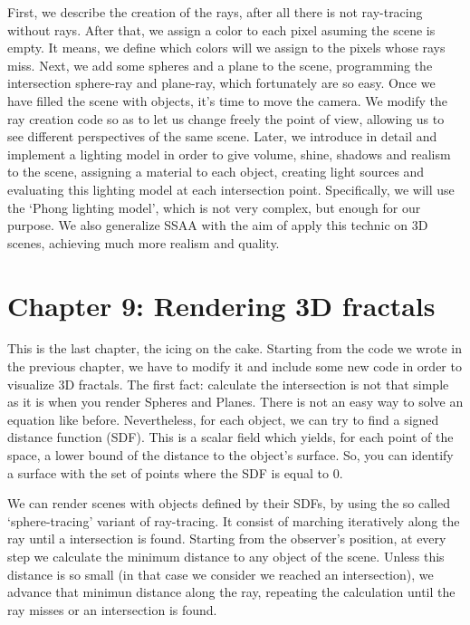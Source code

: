 First, we describe the creation of the rays, after all there is not ray-tracing without rays. After that, we assign a color to each pixel asuming the scene is empty. It means, we define which colors will we assign to the pixels whose rays miss. Next, we add some spheres and a plane to the scene, programming the intersection sphere-ray and plane-ray, which fortunately are so easy. Once we have filled the scene with objects, it's time to move the camera. We modify the ray creation code so as to let us change freely the point of view, allowing us to see different perspectives of the same scene. Later, we introduce in detail and implement a lighting model in order to give volume, shine, shadows and realism to the scene, assigning a material to each object, creating light sources and evaluating this lighting model at each intersection point. Specifically, we will use the `Phong lighting model', which is not very complex, but enough for our purpose. We also generalize SSAA with the aim of apply this technic on 3D scenes, achieving much more realism and quality.

\section*{Chapter 9: Rendering 3D fractals}

This is the last chapter, the icing on the cake. Starting from the code we wrote in the previous chapter, we have to modify it and include some new code in order to visualize 3D fractals. The first fact: calculate the intersection is not that simple as it is when you render Spheres and Planes. There is not an easy way to solve an equation like before. Nevertheless, for each object, we can try to find a signed distance function (SDF). This is a scalar field which yields, for each point of the space, a lower bound of the distance to the object's surface. So, you can identify a surface with the set of points where the SDF is equal to 0.

We can render scenes with objects defined by their SDFs, by using the so called `sphere-tracing' variant of ray-tracing. It consist of marching iteratively along the ray until a intersection is found. Starting from the observer's position, at every step we calculate the minimum distance to any object of the scene. Unless this distance is so small (in that case we consider we reached an intersection), we advance that minimun distance along the ray, repeating the calculation until the ray misses or an intersection is found.

